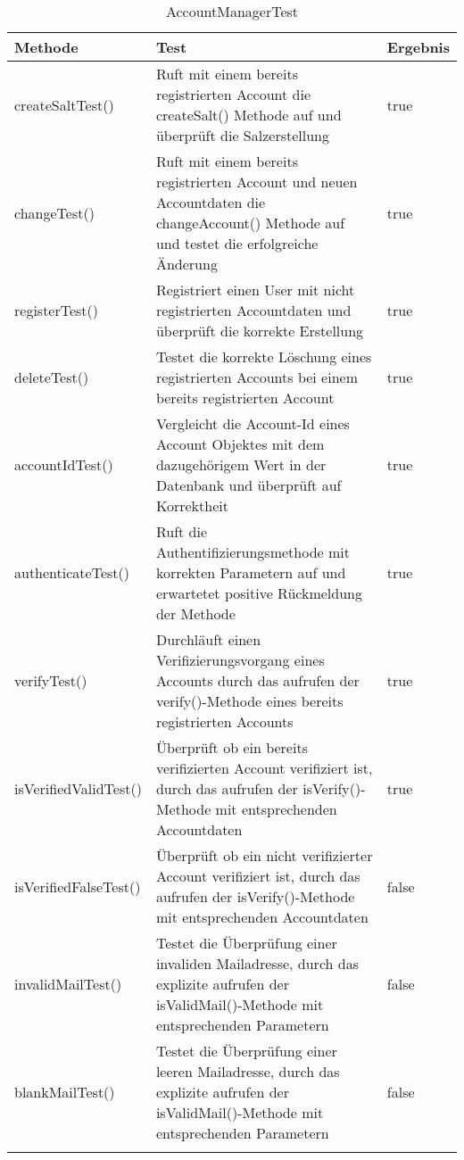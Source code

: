  \begin{longtable}{p{} | p{} | p{}}
\hline
  \textbf{Methode} & \textbf{Test} & \textbf{Ergebnis}\\
  \hline
  createSaltTest() & Ruft mit einem bereits registrierten Account die createSalt() Methode auf und überprüft die Salzerstellung & true \\
  \hline
  changeTest() & Ruft mit einem bereits registrierten Account und neuen Accountdaten die changeAccount() Methode auf und testet die erfolgreiche Änderung & true \\
  \hline
  registerTest() & Registriert einen User mit nicht registrierten Accountdaten und überprüft die korrekte Erstellung & true \\
  \hline
  deleteTest() & Testet die korrekte Löschung eines registrierten Accounts bei einem bereits registrierten Account & true \\
  \hline
  accountIdTest() & Vergleicht die Account-Id eines Account Objektes mit dem dazugehörigem Wert in der Datenbank und überprüft auf Korrektheit & true \\
  \hline
  authenticateTest() &  Ruft die Authentifizierungsmethode mit korrekten Parametern auf und erwartetet positive Rückmeldung der Methode  & true \\
  \hline
  verifyTest() & Durchläuft einen Verifizierungsvorgang eines Accounts durch das aufrufen der verify()-Methode eines bereits registrierten Accounts & true \\
  \hline
  isVerifiedValidTest() & Überprüft ob ein bereits verifizierten Account verifiziert ist, durch das aufrufen der isVerify()-Methode mit entsprechenden Accountdaten & true \\
  \hline
  isVerifiedFalseTest() & Überprüft ob ein nicht verifizierter Account verifiziert ist, durch das aufrufen der isVerify()-Methode mit entsprechenden Accountdaten & false \\
  \hline
  invalidMailTest() & Testet die Überprüfung einer invaliden Mailadresse, durch das explizite aufrufen der isValidMail()-Methode mit entsprechenden Parametern & false \\
  \hline
  blankMailTest() & Testet die Überprüfung einer leeren Mailadresse, durch das explizite aufrufen der isValidMail()-Methode mit entsprechenden Parametern & false \\
  \hline
  \caption{AccountManagerTest}
 \end{longtable}
 
